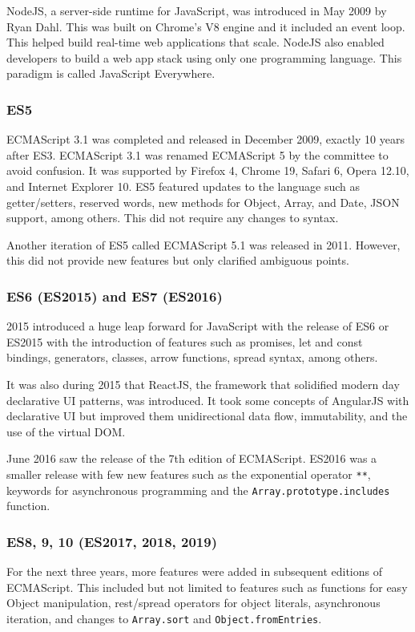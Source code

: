 \documentclass{article}
\newcommand{\jsin}[1]{\texttt{#1}}
\begin{document}
    NodeJS, a server-side runtime for JavaScript, was introduced in May 2009 by
    Ryan Dahl. This was built on Chrome’s V8 engine and it included an event
    loop. This helped build real-time web applications that scale. NodeJS also
    enabled developers to build a web app stack using only one programming
    language. This paradigm is called JavaScript Everywhere.

    \subsubsection{ES5}
    ECMAScript 3.1 was completed and released in December 2009, exactly 10 years
    after ES3. ECMAScript 3.1 was renamed ECMAScript 5 by the committee to avoid
    confusion. It was supported by Firefox 4, Chrome 19, Safari 6, Opera 12.10,
    and Internet Explorer 10. ES5 featured updates to the language such as
    getter/setters, reserved words, new methods for Object, Array, and Date,
    JSON support, among others. This did not require any changes to syntax.

    Another iteration of ES5 called ECMAScript 5.1 was released in 2011.
    However, this did not provide new features but only clarified ambiguous
    points.

    \subsubsection{ES6 (ES2015) and ES7 (ES2016)}
    2015 introduced a huge leap forward for JavaScript with the release of ES6
    or ES2015 with the introduction of features such as promises, let and const
    bindings, generators, classes, arrow functions, spread syntax, among others.

    It was also during 2015 that ReactJS, the framework that solidified modern
    day declarative UI patterns, was introduced. It took some concepts of
    AngularJS with declarative UI but improved them unidirectional data flow,
    immutability, and the use of the virtual DOM.\@

    June 2016 saw the release of the 7th edition of ECMAScript. ES2016 was a
    smaller release with few new features such as the exponential operator
    \jsin{**}, keywords for asynchronous programming and the
    \jsin{Array.prototype.includes} function.

    \subsubsection{ES8, 9, 10 (ES2017, 2018, 2019)}
    For the next three years, more features were added in subsequent editions of
    ECMAScript. This included but not limited to features such as functions for
    easy Object manipulation, rest/spread operators for object literals,
    asynchronous iteration, and changes to \jsin{Array.sort} and
    \jsin{Object.fromEntries}.
\end{document}
